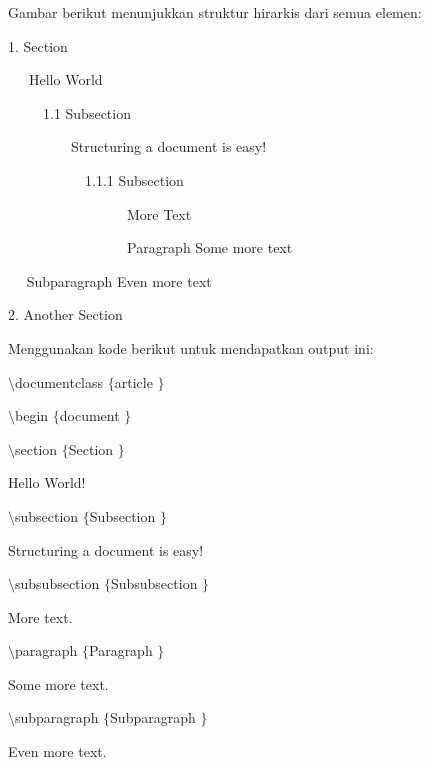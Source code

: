 Gambar berikut menunjukkan struktur hirarkis dari semua elemen:
 \par
1. Section
 \par
~~~Hello World
 \par
~~~~~1.1 Subsection
 \par
~~~~~~~~~Structuring a document is easy!
 \par
~~~~~~~~~~~1.1.1 Subsection
 \par
~~~~~~~~~~~~~~~~~More Text
 \par
~~~~~~~~~~~~~~~~~Paragraph \hspace*{0.5in} Some more text
 \par
~~\hspace*{0.5in} Subparagraph \hspace*{0.5in} Even more text \par
2. Another Section
 \par
Menggunakan kode berikut untuk mendapatkan output ini:
 \par
 $  \setminus  $documentclass $  \{  $article $  \}  $
 \par
\vspace{12pt}
 $  \setminus  $begin $  \{  $document $  \}  $
 \par
\vspace{12pt}
 $  \setminus  $section $  \{  $Section $  \}  $
 \par
\vspace{12pt}
Hello World!
 \par
\vspace{12pt}
 $  \setminus  $subsection $  \{  $Subsection $  \}  $
 \par
\vspace{12pt}
Structuring a document is easy!
 \par
\vspace{12pt}
 $  \setminus  $subsubsection $  \{  $Subsubsection $  \}  $
 \par
\vspace{12pt}
More text.
 \par
\vspace{12pt}
 $  \setminus  $paragraph $  \{  $Paragraph $  \}  $
 \par
\vspace{12pt}
Some more text.
 \par
\vspace{12pt}
 $  \setminus  $subparagraph $  \{  $Subparagraph $  \}  $
 \par
\vspace{12pt}
Even more text.
 \par
